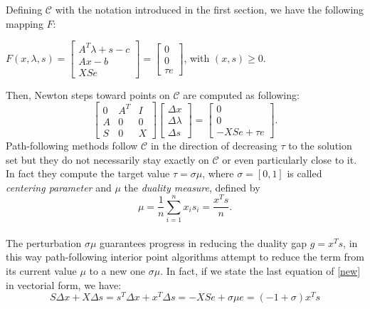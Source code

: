 \documentclass[a4paper,10 pt,titlepage,twoside]{book}
\theoremstyle{plain}
\theoremstyle{definition}
\theoremstyle{remark}
\begin{document}
 
 Defining $\mathcal{C}$ with the notation introduced in the first section, we have the following mapping $\mathit{F}$:
 \begin{center}
 	$\mathit{F}(x,\lambda,s)= \begin{bmatrix}
 	A^{T}\lambda+s-c \\Ax-b \\XSe
 	\end{bmatrix}=\begin{bmatrix} 0\\0\\ \tau e \end{bmatrix}$, with $(x,s)\geq0$.
 \end{center}
Then, Newton steps toward points on $\mathcal{C}$ are computed as following:
 \begin{equation}\label{new}
 \begin{bmatrix}
 0&A^{T}&I \\A&0&0\\S&0&X
 \end{bmatrix}\begin{bmatrix}
 \Delta x\\\Delta\lambda \\\Delta s
 \end{bmatrix}=\begin{bmatrix}
 0\\0\\-XSe + \tau e
 \end{bmatrix}.
 \end{equation}
 Path-following methods follow $\mathcal{C}$ in the direction of decreasing $\tau$ to the solution set but they do not necessarily stay exactly on $\mathcal{C}$ or even particularly close to it. In fact they compute the target value $\tau = \sigma \mu$, where $\sigma = [0,1]$ is called \textit{centering parameter} and $\mu$ the \textit{duality measure}, defined by
 \begin{equation*}
 \mu = \frac{1}{n}\sum_{i=1}^{n} x_{i}s_{i} = \frac{x^{T}s}{n}.
 \end{equation*}\\
 The perturbation $\sigma\mu$ guarantees progress in reducing the duality gap $g = x^{T}s$,
 in this way path-following interior point algorithms attempt to reduce the term from
 its current value $\mu$ to a new one $\sigma\mu$. In fact, if we state the last equation of \ref{new} in vectorial form, we have:
 \begin{equation}
 S\Delta x + X\Delta s = s^{T}\Delta x + x^{T}\Delta s = - XSe + \sigma \mu e = (-1 + \sigma)x^{T}s
 \end{equation}
\end{document}
